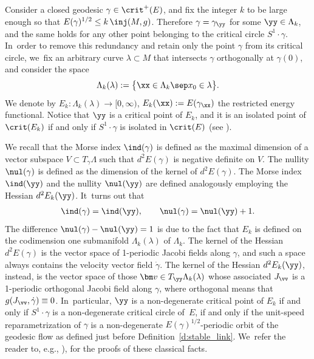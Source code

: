 Consider a closed geodesic $\gamma\in\crit^+(E)$, and fix the integer $k$ to be large enough so that $E(\gamma)^{1/2}\leq k\,\inj(M,g)$. Therefore $\gamma=\gamma_{\yy}$ for some $\yy\in\Lambda_k$, and the same holds for any other point belonging to the critical circle $S^1\cdot\gamma$. In~order to remove this redundancy and retain only the point $\gamma$ from its critical circle, we~fix an arbitrary curve $\lambda\subset M$ that intersects $\gamma$ orthogonally at $\gamma(0)$, and consider the space
\[
\Lambda_k(\lambda) :=\big\{ \xx\in\Lambda_k\sep x_0\in\lambda\big\}.
\]
We denote by $E_k:\Lambda_k(\lambda)\to[0,\infty)$, $E_k(\xx):=E(\gamma_{\xx})$ the restricted energy functional.
Notice that $\yy$ is a critical point of $E_k$, and it is an isolated point of $\crit(E_k)$ if and only if $S^1\cdot\gamma$ is isolated in $\crit(E)$ (see \cite[Prop.\,3.1]{Asselle:2018aa}).

We recall that the Morse index $\ind(\gamma)$ is defined as the maximal dimension of a vector subspace $V\subset T_\gamma \Lambda$ such that $d^2E(\gamma)$ is negative definite on $V$. The nullity $\nul(\gamma)$ is defined as the dimension of the kernel of $d^2E(\gamma)$.
The Morse index $\ind(\yy)$ and the nullity $\nul(\yy)$ are defined analogously employing the Hessian $d^2E_k(\yy)$. It~turns out that
\begin{align*}
\ind(\gamma)=\ind(\yy),\qquad
\nul(\gamma)=\nul(\yy)+1.
\end{align*}
The difference $\nul(\gamma)-\nul(\yy)=1$ is due to the fact that $E_k$ is defined on the codimension one submanifold $\Lambda_k(\lambda)$ of $\Lambda_k$.
The kernel of the Hessian $d^2E(\gamma)$ is the vector space of 1-periodic Jacobi fields along $\gamma$, and such a space always contains the velocity vector field $\dot\gamma$. The kernel of the Hessian $d^2E_k(\yy)$, instead, is the vector space of those $\bm v\in T_{\yy}\Lambda_k(\lambda)$ whose associated $J_{\vv}$ is a 1-periodic orthogonal Jacobi field along $\gamma$, where orthogonal means that $g(J_{\vv},\dot\gamma)\equiv0$. In~particular, $\yy$ is a non-degenerate critical point of $E_k$ if and only if $S^1\cdot\gamma$ is a non-degenerate critical circle of~$E$, if and only if the unit-speed reparametrization of $\gamma$ is a non-degenerate $E(\gamma)^{1/2}$-periodic orbit of the geodesic flow as defined just before Definition~\ref{d:stable_link}. We~refer the reader to, e.g., \cite[\S 4]{Mazzucchelli:2016aa}), for the proofs of these classical facts.

